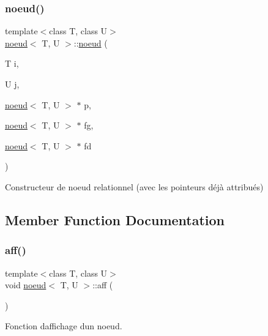 \subsubsection{\texorpdfstring{noeud()}{noeud()}\hspace{0.1cm}{\footnotesize\ttfamily [3/3]}}
{\footnotesize\ttfamily template$<$class T, class U$>$ \\
\hyperlink{classnoeud}{noeud}$<$ T, U $>$\+::\hyperlink{classnoeud}{noeud} (\begin{DoxyParamCaption}\item[{T}]{i,  }\item[{U}]{j,  }\item[{\hyperlink{classnoeud}{noeud}$<$ T, U $>$ $\ast$}]{p,  }\item[{\hyperlink{classnoeud}{noeud}$<$ T, U $>$ $\ast$}]{fg,  }\item[{\hyperlink{classnoeud}{noeud}$<$ T, U $>$ $\ast$}]{fd }\end{DoxyParamCaption})\hspace{0.3cm}{\ttfamily [inline]}}



Constructeur de noeud relationnel (avec les pointeurs déjà attribués) 



\subsection{Member Function Documentation}
\mbox{\label{classnoeud_af6f7f3eb0fa5e063f4fafce09eada25e}} 
\subsubsection{\texorpdfstring{aff()}{aff()}}
{\footnotesize\ttfamily template$<$class T, class U$>$ \\
void \hyperlink{classnoeud}{noeud}$<$ T, U $>$\+::aff (\begin{DoxyParamCaption}{ }\end{DoxyParamCaption})\hspace{0.3cm}{\ttfamily [inline]}}



Fonction d\textquotesingle{}affichage d\textquotesingle{}un noeud. 

\mbox{\label{classnoeud_a2a6e29d59b713f170ca6bf72d2622ee9}} 
